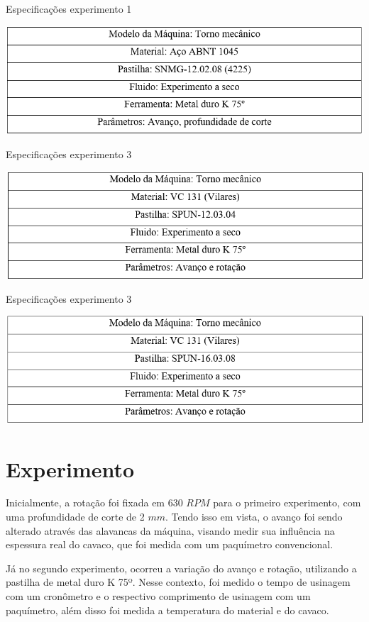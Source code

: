 \documentclass[deposito, acronym, symbols]{fei}
\begin{document}
\begin{table}[!htb]
 \centering
    \caption{Especificações experimento 1}
    \includegraphics[width=0.65\linewidth]{Imagens/Exp03_exp1.png}
    \label{tab:exp1}
 \end{table}
 
\begin{table}[!htb]
 \centering
    \caption{Especificações experimento 3}
    \includegraphics[width=0.65\linewidth]{Imagens/Exp03_exp2.png}
    \label{tab:exp2}
 \end{table}

 \begin{table}[!htb]
 \centering
    \caption{Especificações experimento 3}
    \includegraphics[width=0.65\linewidth]{Imagens/Exp03_exp3.png}
    \label{tab:exp3}
 \end{table}
 
\section{Experimento}

Inicialmente, a rotação foi fixada em 630 $RPM$ para o primeiro experimento, com uma profundidade de corte de 2 $mm$. Tendo isso em vista, o avanço foi sendo alterado através das alavancas da máquina, visando medir sua influência na espessura real do cavaco, que foi medida com um paquímetro convencional.

Já no segundo experimento, ocorreu a variação do avanço e rotação, utilizando a pastilha de metal duro K 75º. Nesse contexto, foi medido o tempo de usinagem com um cronômetro e o respectivo comprimento de usinagem com um paquímetro, além disso foi medida a temperatura do material e do cavaco.
 
\end{document}
